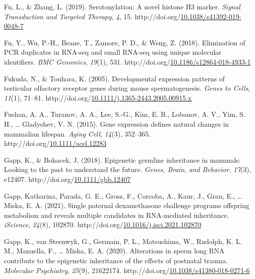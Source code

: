 \documentclass[12pt,twoside]{reedthesis}
\newlength{\cslhangindent}
\newenvironment{CSLReferences}[2] %
 {%
  \setlength{\parindent}{0pt}
  \ifodd #1 \everypar{\setlength{\hangindent}{\cslhangindent}}\ignorespaces\fi
  \ifnum #2 > 0
  \setlength{\parskip}{#2\baselineskip}
  \fi
 }%
 {}
\begin{document}
\begin{CSLReferences}{1}{0}
\leavevmode{}%
Fu, L., \& Zhang, L. (2019). Serotonylation: A novel histone H3 marker. \emph{Signal Transduction and Targeted Therapy}, \emph{4}, 15. http://doi.org/\href{https://doi.org/10.1038/s41392-019-0048-7}{10.1038/s41392-019-0048-7}

\leavevmode{}%
Fu, Y., Wu, P.-H., Beane, T., Zamore, P. D., \& Weng, Z. (2018). Elimination of PCR duplicates in RNA-seq and small RNA-seq using unique molecular identifiers. \emph{BMC Genomics}, \emph{19}(1), 531. http://doi.org/\href{https://doi.org/10.1186/s12864-018-4933-1}{10.1186/s12864-018-4933-1}

\leavevmode{}%
Fukuda, N., \& Touhara, K. (2005). Developmental expression patterns of testicular olfactory receptor genes during mouse spermatogenesis. \emph{Genes to Cells}, \emph{11}(1), 71--81. http://doi.org/\href{https://doi.org/10.1111/j.1365-2443.2005.00915.x}{10.1111/j.1365-2443.2005.00915.x}

\leavevmode{}%
Fushan, A. A., Turanov, A. A., Lee, S.-G., Kim, E. B., Lobanov, A. V., Yim, S. H., \ldots{} Gladyshev, V. N. (2015). Gene expression defines natural changes in mammalian lifespan. \emph{Aging Cell}, \emph{14}(3), 352--365. http://doi.org/\href{https://doi.org/10.1111/acel.12283}{10.1111/acel.12283}

\leavevmode{}%
Gapp, K., \& Bohacek, J. (2018). Epigenetic germline inheritance in mammals: Looking to the past to understand the future. \emph{Genes, Brain, and Behavior}, \emph{17}(3), e12407. http://doi.org/\href{https://doi.org/10.1111/gbb.12407}{10.1111/gbb.12407}

\leavevmode{}%
Gapp, Katharina, Parada, G. E., Gross, F., Corcoba, A., Kaur, J., Grau, E., \ldots{} Miska, E. A. (2021). Single paternal dexamethasone challenge programs offspring metabolism and reveals multiple candidates in RNA-mediated inheritance. \emph{iScience}, \emph{24}(8), 102870. http://doi.org/\href{https://doi.org/10.1016/j.isci.2021.102870}{10.1016/j.isci.2021.102870}

\leavevmode{}%
Gapp, K., van Steenwyk, G., Germain, P. L., Matsushima, W., Rudolph, K. L. M., Manuella, F., \ldots{} Miska, E. A. (2020). Alterations in sperm long RNA contribute to the epigenetic inheritance of the effects of postnatal trauma. \emph{Molecular Psychiatry}, \emph{25}(9), 21622174. http://doi.org/\href{https://doi.org/10.1038/s41380-018-0271-6}{10.1038/s41380-018-0271-6}


\end{CSLReferences}
\end{document}
